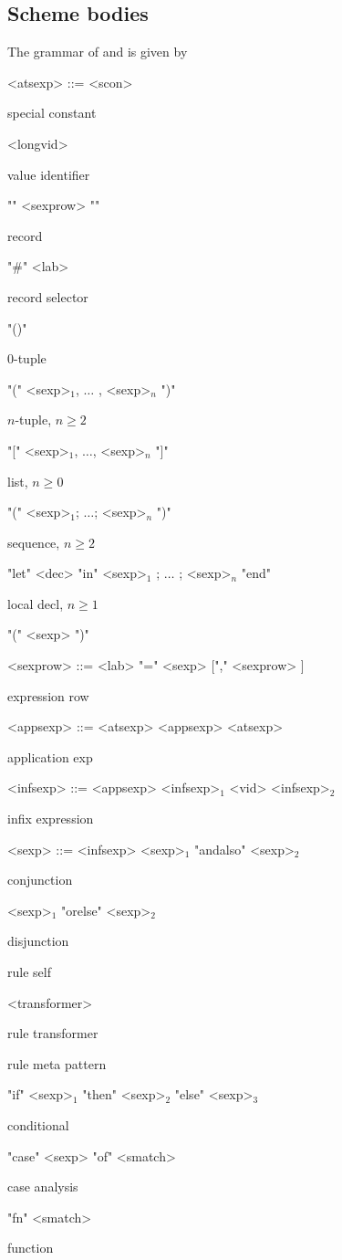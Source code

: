 
\subsection{Scheme bodies}

The grammar of  and  is given by




\begin{nonfloatingtable}

\setlength{\grammarindent}{7em}

\newcommand{\cmt}[1]{\parbox{8em}{\small{#1}}}

\begin{grammar}
 
  <atsexp> ::= <scon>                                            \hfill \cmt{special constant}
  \alt ["op"] <longvid>                                          \hfill \cmt{value identifier}
  \alt "{" <sexprow> "}"                                         \hfill \cmt{record}
  \alt "\#" <lab>                                                \hfill \cmt{record selector}
  \alt "()"                                                      \hfill \cmt{$0$-tuple}
  \alt "(" <sexp>$_1$, $\ldots$ , <sexp>$_n$ ")"                 \hfill \cmt{$n$-tuple, $n \geq 2$}
  \alt "[" <sexp>$_1$, $\ldots$, <sexp>$_n$ "]"                  \hfill \cmt{list, $n \geq 0$}
  \alt "(" <sexp>$_1$; $\ldots$; <sexp>$_n$ ")"                  \hfill \cmt{sequence, $n \geq 2$}  
  \alt "let" <dec> "in" <sexp>$_1$ ; $\ldots$ ; <sexp>$_n$ "end" \hfill \cmt{local decl, $n \geq 1$}
  \alt "(" <sexp> ")"
  
  <sexprow> ::= <lab> "=" <sexp> ["," <sexprow> ]          \hfill \cmt{expression row}

  <appsexp> ::= <atsexp>
  \alt <appsexp> <atsexp>                                  \hfill \cmt{application exp}

  <infsexp> ::= <appsexp>
  \alt <infsexp>$_1$ <vid> <infsexp>$_2$                   \hfill \cmt{infix expression}
  
  <sexp> ::= <infsexp>
  \alt <sexp>$_1$ "andalso" <sexp>$_2$                     \hfill \cmt{conjunction}
  \alt <sexp>$_1$ "orelse"  <sexp>$_2$                     \hfill \cmt{disjunction}
                                           \hfill \cmt{rule self}
  \alt <transformer>                                       \hfill \cmt{rule transformer}
                                   \hfill \cmt{rule meta pattern}
  \alt "if" <sexp>$_1$ "then" <sexp>$_2$ "else" <sexp>$_3$ \hfill \cmt{conditional}
  \alt "case" <sexp> "of" <smatch>                         \hfill \cmt{case analysis}
  \alt "fn" <smatch>                                       \hfill \cmt{function}
  

\end{grammar}
\end{nonfloatingtable}
